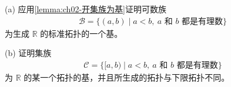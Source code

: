 \documentclass[../../main.tex]{subfiles}
\begin{document}
\begin{exercise}\label{exercise:ch02-拓扑的基-8}
(a) 应用\cref{lemma:ch02-开集族为基}证明可数族
\begin{align*}
\mathcal{B} = \{(a, b) \mid a < b, \ a \text{ 和 } b \text{ 都是有理数}\}
\end{align*}
为生成 $\mathbb{R}$ 的标准拓扑的一个基。

(b) 证明集族
\begin{align*}
\mathcal{C} = \{[a, b) \mid a < b, \ a \text{ 和 } b \text{ 都是有理数}\}
\end{align*}
为 $\mathbb{R}$ 的某一个拓扑的基，并且所生成的拓扑与下限拓扑不同。
\end{exercise}
\end{document}
